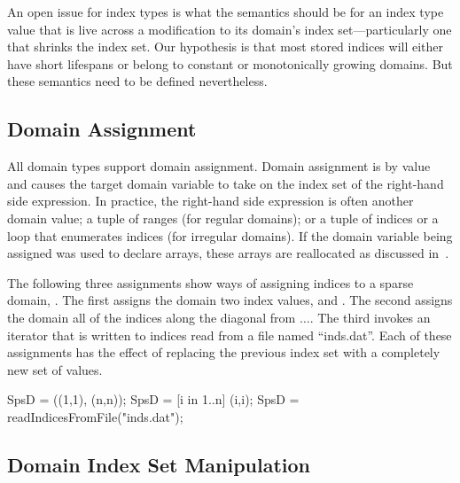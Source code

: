 \begin{openissue}

An open issue for index types is what the semantics should be for an
index type value that is live across a modification to its domain's
index set---particularly one that shrinks the index set.  Our
hypothesis is that most stored indices will either have short
lifespans or belong to constant or monotonically growing domains.  But
these semantics need to be defined nevertheless.

\end{openissue}


\subsection{Domain Assignment}
\label{Domain_Assignment}

All domain types support domain assignment.  Domain assignment is by
value and causes the target domain variable to take on the index set
of the right-hand side expression.  In practice, the right-hand side
expression is often another domain value; a tuple of ranges (for
regular domains); or a tuple of indices or a loop that enumerates
indices (for irregular domains).  If the domain variable being
assigned was used to declare arrays, these arrays are reallocated as
discussed in~.

\begin{example}
The following three assignments show ways of assigning indices to a
sparse domain, .  The first assigns the domain two index
values,  and .  The second assigns the domain
all of the indices along the diagonal from
$\ldots$.  The third invokes an iterator that
is written to  indices read from a file named
``inds.dat''.  Each of these assignments has the effect of replacing
the previous index set with a completely new set of values.
\begin{chapel}
SpsD = ((1,1), (n,n));
SpsD = [i in 1..n] (i,i);
SpsD = readIndicesFromFile("inds.dat");
\end{chapel}
\end{example}

\subsection{Domain Index Set Manipulation}
\label{Domain_Index_Set_Manipulation}

